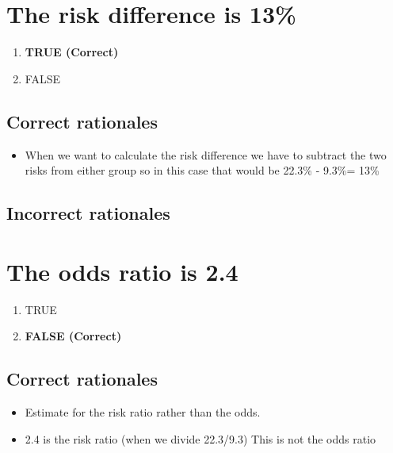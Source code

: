 \documentclass[letterpaper,9pt,twoside,]{pinp}
\providecommand{\tightlist}{%
  \setlength{\itemsep}{0pt}\setlength{\parskip}{0pt}}
\begin{document}
\hypertarget{the-risk-difference-is-13}{%
\section{The risk difference is 13\%}\label{the-risk-difference-is-13}}

\begin{enumerate}
\def\labelenumi{\alph{enumi}.}
\tightlist
\item
  \textbf{TRUE (Correct)}
\item
  FALSE
\end{enumerate}

\hypertarget{correct-rationales}{%
\subsection{Correct rationales}\label{correct-rationales}}

\begin{itemize}
\tightlist
\item
  When we want to calculate the risk difference we have to subtract the
  two risks from either group so in this case that would be 22.3\% -
  9.3\%= 13\%
\end{itemize}

\hypertarget{incorrect-rationales}{%
\subsection{Incorrect rationales}\label{incorrect-rationales}}

\hypertarget{the-odds-ratio-is-2.4}{%
\section{The odds ratio is 2.4}\label{the-odds-ratio-is-2.4}}

\begin{enumerate}
\def\labelenumi{\alph{enumi}.}
\tightlist
\item
  TRUE
\item
  \textbf{FALSE (Correct)}
\end{enumerate}

\hypertarget{correct-rationales-1}{%
\subsection{Correct rationales}\label{correct-rationales-1}}

\begin{itemize}
\tightlist
\item
  Estimate for the risk ratio rather than the odds.
\item
  2.4 is the risk ratio (when we divide 22.3/9.3) This is not the odds
  ratio
\end{itemize}
\end{document}

